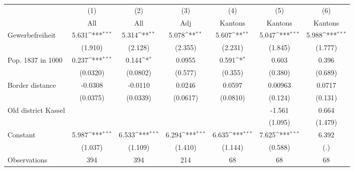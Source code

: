 {
\def\sym#1{\ifmmode^{#1}\else\(^{#1}\)\fi}
\begin{tabular}{l*{6}{c}}
\hline\hline
                    &\multicolumn{1}{c}{(1)}&\multicolumn{1}{c}{(2)}&\multicolumn{1}{c}{(3)}&\multicolumn{1}{c}{(4)}&\multicolumn{1}{c}{(5)}&\multicolumn{1}{c}{(6)}\\
                    &\multicolumn{1}{c}{All}&\multicolumn{1}{c}{All}&\multicolumn{1}{c}{Adj}&\multicolumn{1}{c}{Kantons}&\multicolumn{1}{c}{Kantons}&\multicolumn{1}{c}{Kantons}\\
\hline
Gewerbefreiheit     &       5.631\sym{***}&       5.314\sym{**} &       5.078\sym{**} &       5.607\sym{**} &       5.047\sym{***}&       5.988\sym{***}\\
                    &     (1.910)         &     (2.128)         &     (2.355)         &     (2.231)         &     (1.845)         &     (1.777)         \\
[1em]
Pop. 1837 in 1000   &       0.237\sym{***}&       0.144\sym{*}  &      0.0955         &       0.591\sym{*}  &       0.603         &       0.396         \\
                    &    (0.0320)         &    (0.0802)         &     (0.577)         &     (0.355)         &     (0.380)         &     (0.689)         \\
[1em]
Border distance     &     -0.0308         &     -0.0110         &      0.0246         &      0.0597         &     0.00963         &      0.0717         \\
                    &    (0.0375)         &    (0.0339)         &    (0.0617)         &    (0.0810)         &     (0.124)         &     (0.131)         \\
[1em]
Old district Kassel &                     &                     &                     &                     &      -1.561         &       0.664         \\
                    &                     &                     &                     &                     &     (1.095)         &     (1.479)         \\
[1em]
Constant            &       5.987\sym{***}&       6.533\sym{***}&       6.294\sym{***}&       6.635\sym{***}&       7.625\sym{***}&       6.392         \\
                    &     (1.037)         &     (1.109)         &     (1.410)         &     (1.144)         &     (0.588)         &         (.)         \\
\hline
Observations        &         394         &         394         &         214         &          68         &          68         &          68         \\

\end{tabular}}
